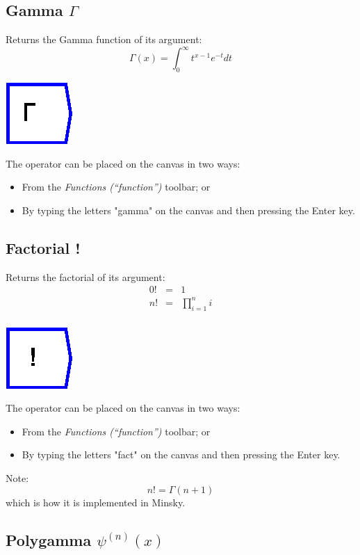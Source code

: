 \subsection{Gamma $\Gamma$}

\label{Operation:Gamma} Returns the Gamma function of its argument:
\[
\Gamma(x)=\int_{0}^{\infty}t^{x-1}e^{-t}dt
\]

\includegraphics{images/Gamma}

The operator can be placed on the canvas in two ways:
\begin{itemize}
\item From the \emph{Functions (``function'')} toolbar; or 
\item By typing the letters "gamma" on the canvas and then pressing the
Enter key.
\end{itemize}

\subsection{Factorial !}

\label{Operation:fact} Returns the factorial of its argument: 
\begin{eqnarray*}
0! & = & 1\\
n! & = & \prod_{i=1}^{n}i\\
\end{eqnarray*}

\includegraphics{images/Factorial}

The operator can be placed on the canvas in two ways:
\begin{itemize}
\item From the \emph{Functions (``function'')} toolbar; or 
\item By typing the letters "fact" on the canvas and then pressing the
Enter key.
\end{itemize}
Note: 
\[
n!=\Gamma(n+1)
\]
which is how it is implemented in Minsky.

\subsection{Polygamma $\psi^{(n)}(x)$}

